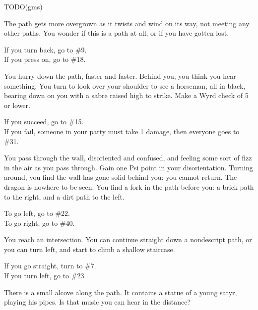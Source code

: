 \documentclass[green]{gl2018}
\begin{document}
\begin{LARGE}
\begin{location}{24}
\end{location}
\begin{location}{25}
TODO(gms)
\end{location}
\begin{location}{26}
The path gets more overgrown as it twists and wind on its way, not meeting any other paths. You wonder if this is a path at all, or if you have gotten lost. 
\begin{fromhere}If you turn back, go to \#9.\\ If you press on, go to \#18.\end{fromhere}
\end{location}
\begin{location}{27}
You hurry down the path,  faster and faster. Behind you, you think you hear something. You turn to look over your shoulder to see a horseman, all in black, bearing down on you with a sabre raised high to strike. Make a Wyrd check of 5 or lower. 
\begin{fromhere}
If you succeed, go to \#15.\\
 If you fail, someone in your party must take 1 damage, then everyone goes to \#31.
\end{fromhere}
\end{location}
\begin{location}{28}
You pass through the wall, disoriented and confused, and feeling some sort of fizz in the air as you pass through.  Gain one Psi point in your disorientation.  Turning around, you find the wall has gone solid behind you: you cannot return.  The dragon is nowhere to be seen.  You find a fork in the path before you: a brick path to the right, and a dirt path to the left.  
\begin{fromhere}To go left, go to \#22.\\  To go right, go to \#40.\end{fromhere}
\end{location}
\begin{location}{29}
You reach an intersection. You can continue straight down a nondescript path, or you can turn left, and start to climb a shallow staircase.  
\begin{fromhere}If you go straight, turn to \#7.\\ If you turn left, go to \#23.\end{fromhere}
\end{location}
\begin{location}{30}
There is a small alcove along the path. It contains a statue of a young satyr, playing his pipes. Is that music you can hear in the distance? 

\end{location}
\end{LARGE}
\end{document}

